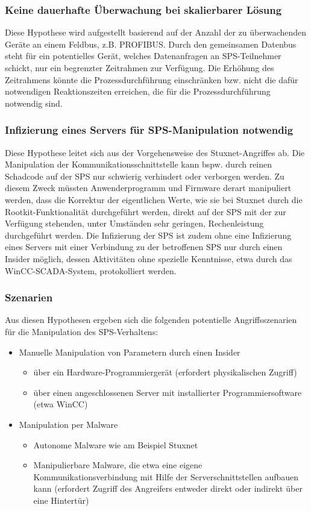 \subsubsection{Keine dauerhafte Überwachung bei skalierbarer Lösung}
Diese Hypothese wird aufgestellt basierend auf der Anzahl der zu überwachenden Geräte an einem Feldbus, z.B. PROFIBUS. Durch den gemeinsamen Datenbus steht für ein potentielles Gerät, welches Datenanfragen an SPS-Teilnehmer schickt, nur ein begrenzter Zeitrahmen zur Verfügung. Die Erhöhung des Zeitrahmens könnte die Prozessdurchführung einschränken bzw. nicht die dafür notwendigen Reaktionszeiten erreichen, die für die Prozessdurchführung notwendig sind. 

\subsubsection{Infizierung eines Servers für SPS-Manipulation notwendig}
Diese Hypothese leitet sich aus der Vorgehensweise des Stuxnet-Angriffes ab. Die Manipulation der Kommunikationsschnittstelle kann bspw. durch reinen Schadcode auf der SPS nur schwierig verhindert oder verborgen werden. Zu diesem Zweck müssten Anwenderprogramm und Firmware derart manipuliert werden, dass die Korrektur der eigentlichen Werte, wie sie bei Stuxnet durch die Rootkit-Funktionalität durchgeführt werden, direkt auf der SPS mit der zur Verfügung stehenden, unter Umständen sehr geringen, Rechenleistung durchgeführt werden. Die Infizierung der SPS ist zudem ohne eine Infizierung eines Servers mit einer Verbindung zu der betroffenen SPS nur durch einen Insider möglich, dessen Aktivitäten ohne spezielle Kenntnisse, etwa durch das WinCC-SCADA-System, protokolliert werden.

\subsubsection{Szenarien}
Aus diesen Hypothesen ergeben sich die folgenden potentielle Angriffsszenarien für die Manipulation des SPS-Verhaltens:

\begin{itemize}
\item Manuelle Manipulation von Parametern durch einen Insider 
\begin{itemize}
\item über ein Hardware-Programmiergerät (erfordert physikalischen Zugriff)
\item über einen angeschlossenen Server mit installierter Programmiersoftware (etwa WinCC)
\end{itemize}
\item Manipulation per Malware
\begin{itemize}
\item Autonome Malware wie am Beispiel Stuxnet
\item Manipulierbare Malware, die etwa eine eigene Kommunikationsverbindung mit Hilfe der Serverschnittstellen aufbauen kann (erfordert Zugriff des Angreifers entweder direkt oder indirekt über eine Hintertür)
\end{itemize}
\end{itemize}

